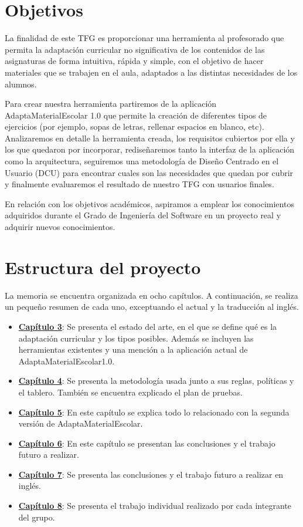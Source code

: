 \section{Objetivos}\label{cap:objetivos}
La finalidad de este TFG es proporcionar una herramienta al profesorado que permita la adaptación curricular no significativa de los contenidos de las asignaturas de forma intuitiva, rápida y simple, con el objetivo de hacer materiales que se trabajen en el aula, adaptados a las distintas necesidades de los alumnos.

Para crear nuestra herramienta partiremos de la aplicación AdaptaMaterialEscolar 1.0  que permite la creación de diferentes tipos de ejercicios (por ejemplo, sopas de letras, rellenar espacios en blanco, etc). Analizaremos en detalle la herramienta creada, los requisitos cubiertos por ella y los que quedaron por incorporar, rediseñaremos tanto la interfaz de la aplicación como la arquitectura, seguiremos una metodología de Diseño Centrado en el Usuario (DCU) para encontrar cuales son las necesidades que quedan por cubrir y finalmente evaluaremos el resultado de nuestro TFG con usuarios finales.
 
En relación con los objetivos académicos, aspiramos a emplear los conocimientos adquiridos durante el Grado de Ingeniería del Software en un proyecto real y adquirir nuevos conocimientos.



\section{Estructura del proyecto}\label{cap:estructura}
La memoria se encuentra organizada en ocho capítulos. A continuación, se realiza un pequeño resumen de cada uno, exceptuando el actual y la traducción al inglés.
\begin{itemize}
    \item \textbf{\hyperref[cap:estadoDelArte]{Capítulo 3}}: Se presenta el estado del arte, en el que se define qué es la adaptación curricular y los tipos posibles. Además se incluyen las herramientas existentes y una mención a la aplicación actual de  AdaptaMaterialEscolar1.0.
    \item \textbf{\hyperref[cap:metodologia]{Capítulo 4}}: Se presenta la metodología usada junto a sus reglas, políticas y el tablero. También se encuentra explicado el plan de pruebas.
    \item \textbf{\hyperref[cap:AdaptaMaterialEscolar2.0]{Capítulo 5}}: En este capítulo se explica todo lo relacionado con la segunda versión de AdaptaMaterialEscolar.
    \item \textbf{\hyperref[cap:conclusiones]{Capítulo 6}}: En este capítulo se presentan las conclusiones y el trabajo futuro a realizar.
    \item \textbf{\hyperref[cap:conclusions]{Capítulo 7}}: Se presenta las conclusiones y el trabajo futuro a realizar en inglés.
    \item \textbf{\hyperref[cap:TrabajoIndividual]{Capítulo 8}}: Se presenta el trabajo individual realizado por cada integrante del grupo.
\end{itemize}